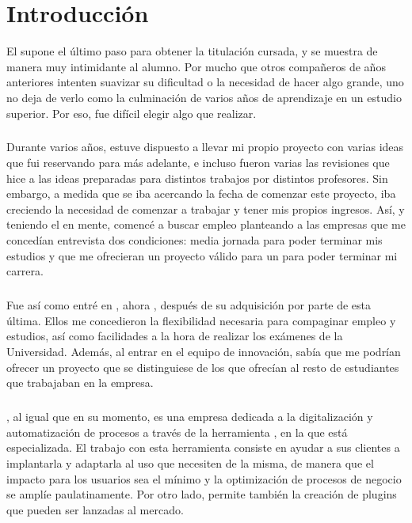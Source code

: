 \documentclass{subfiles}
\begin{document}
    \chapter{Introducción}
    \label{chap:introduccion}

\setcounter{page}{1}

        {El \TFG supone el último paso para obtener la titulación cursada, y se muestra de manera muy intimidante al alumno. Por mucho que otros compañeros de años anteriores intenten suavizar su dificultad o la necesidad de hacer algo grande, uno no deja de verlo como la culminación de varios años de aprendizaje en un estudio superior. Por eso, fue difícil elegir algo que realizar.}
      
        \paragraph{}
        {Durante varios años, estuve dispuesto a llevar mi propio proyecto con varias ideas que fui reservando para más adelante, e incluso fueron varias las revisiones que hice a las ideas preparadas para distintos trabajos por distintos profesores. Sin embargo, a medida que se iba acercando la fecha de comenzar este proyecto, iba creciendo la necesidad de comenzar a trabajar y tener mis propios ingresos. Así, y teniendo el \TFG en mente, comencé a buscar empleo planteando a las empresas que me concedían entrevista dos condiciones: media jornada para poder terminar mis estudios y que me ofrecieran un proyecto válido para un \tfg para poder terminar mi carrera.}
      
        \paragraph{}
        {Fue así como entré en \silverstorm, ahora \thirdera, después de su adquisición por parte de esta última. Ellos me concedieron la flexibilidad necesaria para compaginar empleo y estudios, así como facilidades a la hora de realizar los exámenes de la Universidad. Además, al entrar en el equipo de innovación, sabía que me podrían ofrecer un proyecto que se distinguiese de los que ofrecían al resto de estudiantes que trabajaban en la empresa.}

        \paragraph{}
        {\thirdera, al igual que \silverstorm en su momento, es una empresa dedicada a la digitalización y automatización de procesos a través de la herramienta \servicenow, en la que está especializada. El trabajo con esta herramienta consiste en ayudar a sus clientes a implantarla y adaptarla al uso que necesiten de la misma, de manera que el impacto para los usuarios sea el mínimo y la optimización de procesos  de negocio se amplíe paulatinamente. Por otro lado, \servicenow permite también la creación de plugins que pueden ser lanzadas al mercado.}
\end{document}
